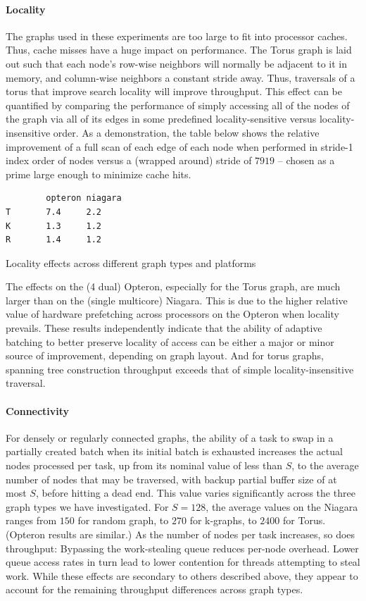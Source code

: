 \paragraph{Locality} The graphs used in these experiments are too large to fit
into processor caches. Thus, cache misses have a huge impact on
performance. The Torus graph is laid out such that each node's
row-wise neighbors will normally be adjacent to it in memory, and
column-wise neighbors a constant stride away. Thus, traversals of a
torus that improve search locality will improve throughput.  This
effect can be quantified by comparing the performance of simply
accessing all of the nodes of the graph via all of its edges in some
predefined locality-sensitive versus locality-insensitive order.  As a
demonstration, the table below shows the relative
improvement of a full scan of each edge of each node when performed in
stride-1 index order of nodes versus a (wrapped around) stride of
$7919$ -- chosen as a prime large enough to minimize cache hits.  
\begin{table}
{\footnotesize
\begin{verbatim}
        opteron niagara
T       7.4     2.2
K       1.3     1.2
R       1.4     1.2
\end{verbatim}}
\caption{Locality effects across different graph types and platforms}
\end{table}
The
effects on the (4 dual) Opteron, especially for the Torus graph, are
much larger than on the (single multicore) Niagara. This is due to the
higher relative value of hardware prefetching across processors on the
Opteron when locality prevails.  These results independently indicate
that the ability of adaptive batching to better preserve locality of
access can be either a major or minor source of improvement, depending
on graph layout.  And for torus graphs, spanning tree construction
throughput exceeds that of simple locality-insensitive traversal.

\paragraph{Connectivity}  For densely or regularly connected graphs, the
ability of a task to swap in a partially created batch when its
initial batch is exhausted increases the actual nodes processed per
task, up from its nominal value of less than $S$, to the average number
of nodes that may be traversed, with backup partial buffer size of at
most $S$, before hitting a dead end. This value varies significantly
across the three graph types we have investigated. For $S=128$, the
average values on the Niagara ranges from $150$ for random graph, to $270$
for k-graphs, to $2400$ for Torus. (Opteron results are similar.) As the
number of nodes per task increases, so does throughput: Bypassing the
work-stealing queue reduces per-node overhead.  Lower queue access
rates in turn lead to lower contention for threads attempting to steal
work. While these effects are secondary to others described above,
they appear to account for the remaining throughput differences across
graph types.

